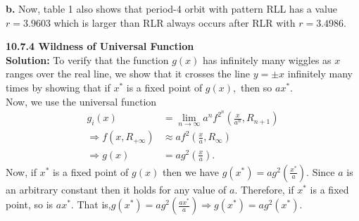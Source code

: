 \documentclass[12pt]{article}
\newcommand{\mycbox}[1]{\tikz{\path[draw=#1,fill=#1] (0,0) rectangle (.2cm,.2cm);}}
\begin{document}
{\bf b. } Now, table 1 also shows that period-4 orbit with pattern RLL has a value $r=3.9603$ which is larger than RLR always occurs after RLR with $r=3.4986.$\\

\bigskip

\noindent
{\bf 10.7.4 Wildness of Universal Function }\\
{\bf Solution: } To verify that the function $g(x)$ has infinitely many wiggles as $x$ ranges over the real line, we show that it crosses the line $y=\pm x$ infinitely many times by showing that if $x^*$ is a fixed point of $g(x),$ then so $ax^*.$\\  
Now, we use the universal function
\begin{align*}
g_i(x)&=\lim_{n\to\infty} a^n f^{2^n}\left(\frac{x}{a^n}, R_{n+1}\right)\\
\Rightarrow f\left(x,R_{+\infty}\right)&\approx a f^2\left(\frac{x}{a}, R_{\infty}\right)\\
\Rightarrow g(x)&=ag^2\left(\frac{x}{a}\right).
\end{align*} 
 Now, if $x^*$ is a fixed point of $g(x)$ then we have $g(x^*)=ag^2\left(\frac{x^*}{a}\right).$ Since $a$ is an arbitrary constant then it holds for any value of $a.$ Therefore, if $x^*$ is a fixed point, so is $ax^*.$ That is,$g(x^*)=ag^2\left(\frac{ax^*}{a}\right)\Rightarrow g(x^*)=ag^2\left(x^*\right)$. \mycbox{black}
\end{document}
